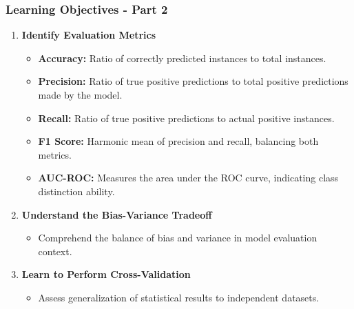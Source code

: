 \documentclass{beamer}
\begin{document}
\begin{frame}[fragile]
    \frametitle{Learning Objectives - Part 2}
    \begin{enumerate}[resume]
        \item \textbf{Identify Evaluation Metrics}
            \begin{itemize}
                \item \textbf{Accuracy:} Ratio of correctly predicted instances to total instances.
                \item \textbf{Precision:} Ratio of true positive predictions to total positive predictions made by the model.
                \item \textbf{Recall:} Ratio of true positive predictions to actual positive instances.
                \item \textbf{F1 Score:} Harmonic mean of precision and recall, balancing both metrics.
                \item \textbf{AUC-ROC:} Measures the area under the ROC curve, indicating class distinction ability.
            \end{itemize}

        \item \textbf{Understand the Bias-Variance Tradeoff}
            \begin{itemize}
                \item Comprehend the balance of bias and variance in model evaluation context.
            \end{itemize}

        \item \textbf{Learn to Perform Cross-Validation}
            \begin{itemize}
                \item Assess generalization of statistical results to independent datasets.
            \end{itemize}
    \end{enumerate}
\end{frame}
\end{document}
